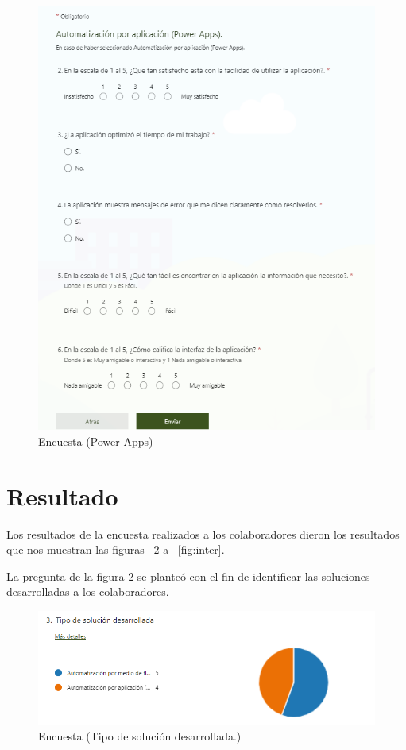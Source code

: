 \begin{figure}[H]
	\centering
	\includegraphics[scale=0.4]{Capitulo5/imagenes/app2.1}
	\caption{Encuesta (Power Apps)}
	\label{fig:fomrs3}
\end{figure}

\section{Resultado}
Los resultados de la encuesta realizados a los colaboradores dieron los resultados que nos muestran las figuras ~\ref{fig:soldes} a ~\ref{fig:inter}.

La pregunta de la figura \ref{fig:soldes} se planteó  con el fin de identificar las soluciones desarrolladas a los colaboradores.
\begin{figure}[H]
	\centering
	\includegraphics[scale=0.5]{Capitulo5/imagenes/4}
	\caption{Encuesta (Tipo de solución desarrollada.)}
	\label{fig:soldes}
\end{figure}

